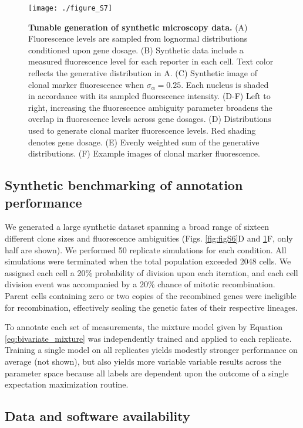 \begin{figure}[h]
\texttt{[image: ./figure\_S7]}
\caption[Tunable generation of synthetic microscopy data.]{\textbf{Tunable generation of synthetic microscopy data.} (A) Fluorescence levels are sampled from lognormal distributions conditioned upon gene dosage. (B) Synthetic data include a measured fluorescence level for each reporter in each cell. Text color reflects the generative distribution in A. (C) Synthetic image of clonal marker fluorescence when $\sigma_{\alpha}=0.25$. Each nucleus is shaded in accordance with its sampled fluorescence intensity. (D-F) Left to right, increasing the fluorescence ambiguity parameter broadens the overlap in fluorescence levels across gene dosages. (D) Distributions used to generate clonal marker fluorescence levels. Red shading denotes gene dosage. (E) Evenly weighted sum of the generative distributions. (F) Example images of clonal marker fluorescence.}
\label{fig:figS7}
\end{figure}


\subsection{Synthetic benchmarking of annotation performance}

We generated a large synthetic dataset spanning a broad range of sixteen different clone sizes and fluorescence ambiguities (Figs. \ref{fig:figS6}D and \ref{fig:figS7}F, only half are shown). We performed 50 replicate simulations for each condition. All simulations were terminated when the total population exceeded 2048 cells. We assigned each cell a 20\% probability of division upon each iteration, and each cell division event was accompanied by a 20\% chance of mitotic recombination. Parent cells containing zero or two copies of the recombined genes were ineligible for recombination, effectively sealing the genetic fates of their respective lineages. 

To annotate each set of measurements, the mixture model given by Equation \ref{eq:bivariate_mixture} was independently trained and applied to each replicate. Training a single model on all replicates yields modestly stronger performance on average (not shown), but also yields more variable variable results across the parameter space because all labels are dependent upon the outcome of a single expectation maximization routine. 


\subsection{Data and software availability}

